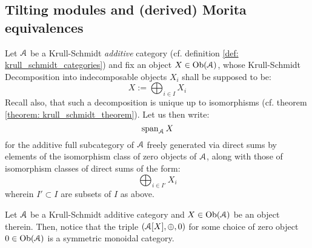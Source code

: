             \begin{example}
                
            \end{example}
            \begin{example}
                
            \end{example}
            \begin{example}
                
            \end{example}
            \begin{example}
                
            \end{example}
            \begin{example}
                
            \end{example}
        
    \subsection{Tilting modules and (derived) Morita equivalences}
        \begin{convention} \label{conv: minimal_additive_subcategories}
            Let $\mathcal{A}$ be a Krull-Schmidt \textit{additive} category (cf. definition \ref{def: krull_schmidt_categories}) and fix an object $X \in \mathrm{Ob}(\mathcal{A})$, whose Krull-Schmidt Decomposition into indecomposable objects $X_i$ shall be supposed to be:
                $$X := \bigoplus_{i \in I} X_i$$
            Recall also, that such a decomposition is unique up to isomorphisms (cf. theorem \ref{theorem: krull_schmidt_theorem}). Let us then write:
                $$\operatorname{span}_{\mathcal{A}} X$$
            for the additive full subcategory of $\mathcal{A}$ freely generated via direct sums by elements of the isomorphism class of zero objects of $\mathcal{A}$, along with those of isomorphism classes of direct sums of the form:
                $$\bigoplus_{i \in I'} X_i$$
            wherein $I' \subset I$ are subsets of $I$ as above. 
        \end{convention}
        \begin{remark}
            Let $\mathcal{A}$ be a Krull-Schmidt additive category and $X \in \mathrm{Ob}(\mathcal{A})$ be an object therein. Then, notice that the triple $(\mathcal{A}[X], \oplus, 0)$ for some choice of zero object $0 \in \mathrm{Ob}(\mathcal{A})$ is a symmetric monoidal category. 
        \end{remark}
    
